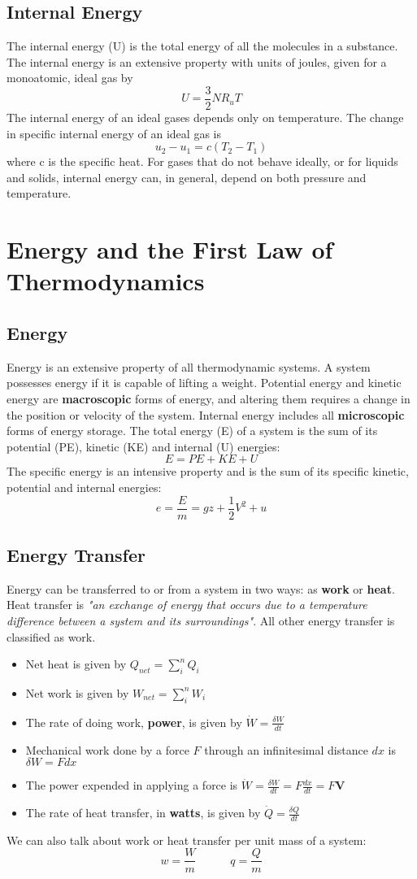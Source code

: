 \documentclass[11pt]{article}
\begin{document}
\subsection{Internal Energy}
The internal energy (U) is the total energy of all the molecules in a substance. The internal energy is an extensive property with units of joules, given for a monoatomic, ideal gas by
$$U = \frac{3}{2}NR_uT$$
The internal energy of an ideal gases depends only on temperature. The change in specific internal energy of an ideal gas is 
$$ u_2 - u_1 = c(T_2-T_1)$$ 
where c is the specific heat. For gases that do not behave ideally, or for liquids and solids, internal energy can, in general, depend on both pressure and temperature.

\pagebreak

\section{Energy and the First Law of Thermodynamics}
\subsection{Energy}
Energy is an extensive property of all thermodynamic systems. A system possesses energy if it is capable of lifting a weight. Potential energy and kinetic energy are \textbf{macroscopic} forms of energy, and altering them requires a change in the position or velocity of the system. Internal energy includes all \textbf{microscopic} forms of energy storage. The total energy (E) of a system is the sum of its potential (PE), kinetic (KE) and internal (U) energies: 
$$ E = PE + KE + U$$ The specific energy is an intensive property and is the sum of its specific kinetic, potential and internal energies:
$$e = \frac{E}{m} = gz + \frac{1}{2}V^2 + u$$

 
\subsection{Energy Transfer}
Energy can be transferred to or from a system in two ways: as \textbf{work} or \textbf{heat}. Heat transfer is \textit{"an exchange of energy that occurs due to a temperature difference between a system and its surroundings"}. All other energy transfer is classified as work.
\begin{itemize}
\item Net heat is given by $Q_{net} = \sum_{i}^n Q_i$
\item Net work is given by $W_{net} = \sum_{i}^n W_i$
\item The rate of doing work, \textbf{power}, is given by  $\dot W = \frac{\delta W}{dt}$
\item Mechanical work done by a force $F$ through an infinitesimal distance $dx$ is $\delta W = Fdx$
\item The power expended in applying a force is $\dot W = \frac{\delta W}{dt} = F \frac{dx}{dt} = F\textbf{V}$
\item The rate of heat transfer, in \textbf{watts}, is given by  $ \dot Q = \frac{\delta Q}{dt}$
\end{itemize}
We can also talk about work or heat transfer per unit mass of a system:
$$ w = \frac{W}{m} \quad \quad \quad q = \frac{Q}{m}$$
\end{document}
